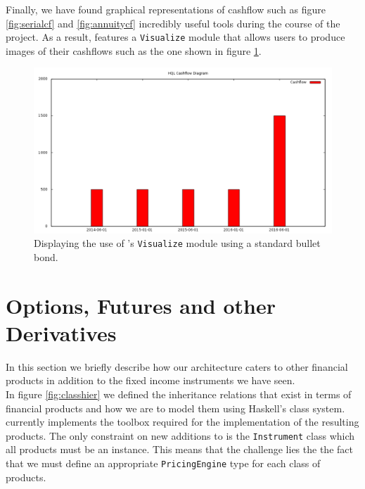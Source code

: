 \vspace{0.3cm}

Finally, we have found graphical representations of cashflow such as figure
\ref{fig:serialcf} and \ref{fig:annuitycf} incredibly useful tools during
the course of the project. As a result, \hql features a \texttt{Visualize}
module that allows users to produce images of their cashflows such as the 
one shown in figure \ref{fig:awesomeness}.

\begin{figure}[h!]
\begin{center}
\includegraphics[keepaspectratio=true,scale=0.4]{images/GraphicsModuleAwesome.png}
\caption{Displaying the use of \hql's \texttt{Visualize} module using a standard bullet bond.}
\label{fig:awesomeness}
\end{center}
\end{figure}


\section{Options, Futures and other Derivatives}

In this section we briefly describe how our architecture caters to other
financial products in addition to the fixed income instruments we have seen.\\

In figure \ref{fig:classhier} we defined the inheritance relations that
exist in terms of financial products and how we are to model them using 
Haskell's class system. \hql currently implements the toolbox required
for the implementation of the resulting products. The only constraint on
new additions to \hql is the \texttt{Instrument} class which all products
must be an instance. This means that the challenge lies the the fact
that we must define an appropriate \texttt{PricingEngine} type for each
class of products.\\

